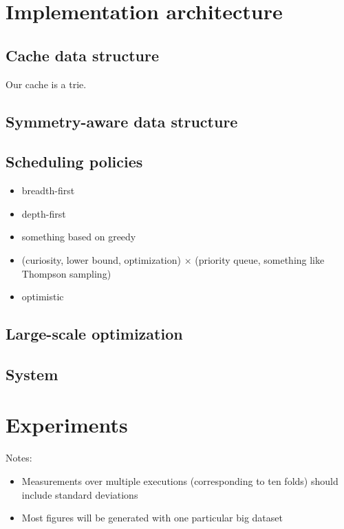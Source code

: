 \section{Implementation architecture}

\subsection{Cache data structure}
\label{sec:cache}

Our cache is a trie.

\subsection{Symmetry-aware data structure}

\subsection{Scheduling policies}

\begin{itemize}
\item breadth-first
\item depth-first
\item something based on greedy
\item (curiosity, lower bound, optimization) $\times$ (priority queue, something like Thompson sampling)
\item optimistic
\end{itemize}

\subsection{Large-scale optimization}

\subsection{System}

\section{Experiments}

Notes:
\begin{itemize}

\item Measurements over multiple executions (corresponding to ten folds)
should include standard deviations

\item Most figures will be generated with one particular big dataset
\end{itemize}


